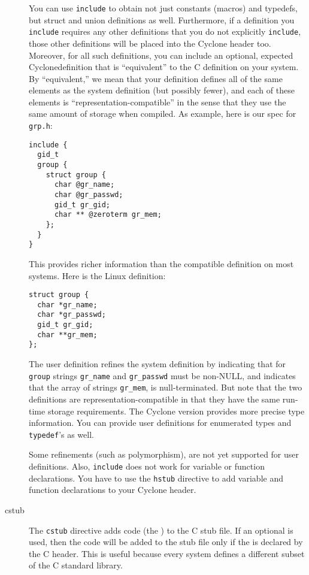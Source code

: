 \begin{description}
You can use \texttt{include} to obtain not just constants (macros) and
typedefs, but struct and union definitions as well.  Furthermore, if a
definition you \texttt{include} requires any other definitions that you do
not explicitly \texttt{include}, those other definitions will be placed into
the Cyclone header too.  Moreover, for all such definitions, you can include
an optional, expected Cyclonedefinition that is ``equivalent'' to the C
definition on your system.  By ``equivalent,'' we mean that your definition
defines all of the same elements as the system definition (but possibly
fewer), and each of these elements is ``representation-compatible'' in the
sense that they use the same amount of storage when compiled.  As example,
here is our spec for \texttt{grp.h}:
\begin{verbatim}
include {
  gid_t
  group {
    struct group {
      char @gr_name;
      char @gr_passwd;
      gid_t gr_gid;
      char ** @zeroterm gr_mem;
    };  
  }
}
\end{verbatim}
This provides richer information than the compatible definition on most
systems.  Here is the Linux definition:
\begin{verbatim}
struct group {
  char *gr_name;
  char *gr_passwd;
  gid_t gr_gid;
  char **gr_mem;
};  
\end{verbatim}
The user definition refines the system definition by indicating that for
\texttt{group} strings \texttt{gr\_name} and \texttt{gr\_passwd} must be
non-NULL, and indicates that the array of strings \texttt{gr\_mem}, is
null-terminated.  But note that the two definitions are
representation-compatible in that they have the same run-time storage
requirements.  The Cyclone version provides more precise type
information.  You can provide user definitions for enumerated types and
\texttt{typedef}'s as well.

Some refinements (such as polymorphism), are not yet supported for user
definitions.  Also, \texttt{include} does not work for variable or function
declarations.  You have to use the \texttt{hstub} directive to add variable
and function declarations to your Cyclone header.

\item[cstub]
The \texttt{cstub} directive adds code (the )
to the C stub file.  If an optional  is used, then the code
will be added to the stub file only if the  is declared by the
C header.  This is useful because every system defines a different
subset of the C standard library.


\end{description}
